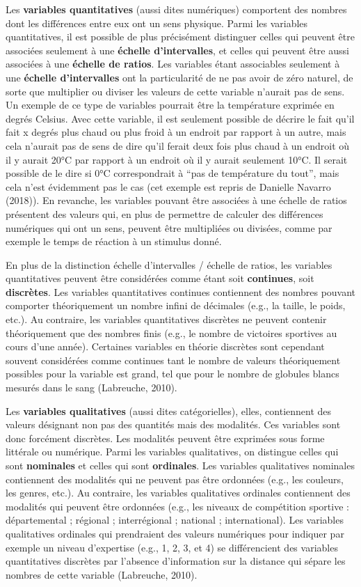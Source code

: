 \documentclass[
  letterpaper,
]{book}
\begin{document}
Les \textbf{variables quantitatives} (aussi dites numériques) comportent
des nombres dont les différences entre eux ont un sens physique. Parmi
les variables quantitatives, il est possible de plus précisément
distinguer celles qui peuvent être associées seulement à une
\textbf{échelle d'intervalles}, et celles qui peuvent être aussi
associées à une \textbf{échelle de ratios}. Les variables étant
associables seulement à une \textbf{échelle d'intervalles} ont la
particularité de ne pas avoir de zéro naturel, de sorte que multiplier
ou diviser les valeurs de cette variable n'aurait pas de sens. Un
exemple de ce type de variables pourrait être la température exprimée en
degrés Celsius. Avec cette variable, il est seulement possible de
décrire le fait qu'il fait x degrés plus chaud ou plus froid à un
endroit par rapport à un autre, mais cela n'aurait pas de sens de dire
qu'il ferait deux fois plus chaud à un endroit où il y aurait 20°C par
rapport à un endroit où il y aurait seulement 10°C. Il serait possible
de le dire si 0°C correspondrait à ``pas de température du tout'', mais
cela n'est évidemment pas le cas (cet exemple est repris de Danielle
Navarro (2018)). En revanche, les variables pouvant être associées à une
échelle de ratios présentent des valeurs qui, en plus de permettre de
calculer des différences numériques qui ont un sens, peuvent être
multipliées ou divisées, comme par exemple le temps de réaction à un
stimulus donné.

En plus de la distinction échelle d'intervalles / échelle de ratios, les
variables quantitatives peuvent être considérées comme étant soit
\textbf{continues}, soit \textbf{discrètes}. Les variables quantitatives
continues contiennent des nombres pouvant comporter théoriquement un
nombre infini de décimales (e.g., la taille, le poids, etc.). Au
contraire, les variables quantitatives discrètes ne peuvent contenir
théoriquement que des nombres finis (e.g., le nombre de victoires
sportives au cours d'une année). Certaines variables en théorie
discrètes sont cependant souvent considérées comme continues tant le
nombre de valeurs théoriquement possibles pour la variable est grand,
tel que pour le nombre de globules blancs mesurés dans le sang
(Labreuche, 2010).

Les \textbf{variables qualitatives} (aussi dites catégorielles), elles,
contiennent des valeurs désignant non pas des quantités mais des
modalités. Ces variables sont donc forcément discrètes. Les modalités
peuvent être exprimées sous forme littérale ou numérique. Parmi les
variables qualitatives, on distingue celles qui sont \textbf{nominales}
et celles qui sont \textbf{ordinales}. Les variables qualitatives
nominales contiennent des modalités qui ne peuvent pas être ordonnées
(e.g., les couleurs, les genres, etc.). Au contraire, les variables
qualitatives ordinales contiennent des modalités qui peuvent être
ordonnées (e.g., les niveaux de compétition sportive : départemental ;
régional ; interrégional ; national ; international). Les variables
qualitatives ordinales qui prendraient des valeurs numériques pour
indiquer par exemple un niveau d'expertise (e.g., 1, 2, 3, et 4) se
différencient des variables quantitatives discrètes par l'absence
d'information sur la distance qui sépare les nombres de cette variable
(Labreuche, 2010).
\end{document}
